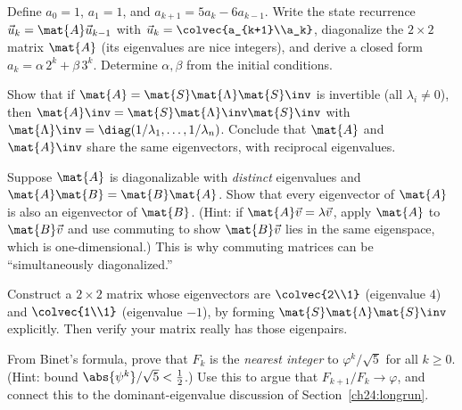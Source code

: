 \begin{exercise}
\label{ch24:ex-recurrence}
Define $a_0 = 1$, $a_1 = 1$, and $a_{k+1} = 5a_k - 6a_{k-1}$. Write the state
recurrence $\vec{u}_k = \mat{A}\vec{u}_{k-1}$ with $\vec{u}_k =
\colvec{a_{k+1}\\a_k}$, diagonalize the $2\times2$ matrix $\mat{A}$ (its
eigenvalues are nice integers), and derive a closed form $a_k = \alpha\,2^k +
\beta\,3^k$. Determine $\alpha,\beta$ from the initial conditions.
\end{exercise}

\begin{exercise}
\label{ch24:ex-inverse}
Show that if $\mat{A} = \mat{S}\mat{\Lambda}\mat{S}\inv$ is invertible (all
$\lambda_i\neq0$), then $\mat{A}\inv = \mat{S}\mat{\Lambda}\inv\mat{S}\inv$ with
$\mat{\Lambda}\inv = \diag(1/\lambda_1,\dots,1/\lambda_n)$. Conclude that
$\mat{A}$ and $\mat{A}\inv$ share the same eigenvectors, with reciprocal
eigenvalues.
\end{exercise}

\begin{exercise}
\label{ch24:ex-commute}
Suppose $\mat{A}$ is diagonalizable with \emph{distinct} eigenvalues and
$\mat{A}\mat{B} = \mat{B}\mat{A}$. Show that every eigenvector of $\mat{A}$ is
also an eigenvector of $\mat{B}$. (Hint: if $\mat{A}\vec{v} = \lambda\vec{v}$,
apply $\mat{A}$ to $\mat{B}\vec{v}$ and use commuting to show $\mat{B}\vec{v}$
lies in the same eigenspace, which is one-dimensional.) This is why commuting
matrices can be ``simultaneously diagonalized.''
\end{exercise}

\begin{exercise}
\label{ch24:ex-build}
Construct a $2\times2$ matrix whose eigenvectors are $\colvec{2\\1}$ (eigenvalue
$4$) and $\colvec{1\\1}$ (eigenvalue $-1$), by forming
$\mat{S}\mat{\Lambda}\mat{S}\inv$ explicitly. Then verify your matrix really has
those eigenpairs.
\end{exercise}

\begin{exercise}
\label{ch24:ex-fib-asymp}
From Binet's formula, prove that $F_k$ is the \emph{nearest integer} to
$\varphi^k/\sqrt5$ for all $k\ge0$. (Hint: bound $\abs{\psi^k}/\sqrt5 <
\tfrac12$.) Use this to argue that $F_{k+1}/F_k \to \varphi$, and connect this to
the dominant-eigenvalue discussion of Section~\ref{ch24:longrun}.
\end{exercise}

